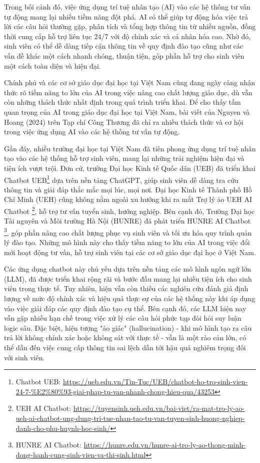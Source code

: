 \documentclass[a4paper,12pt]{article}
\begin{document}
Trong bối cảnh đó, việc ứng dụng trí tuệ nhân tạo (AI) vào các hệ thống tư vấn tự động mang lại nhiều tiềm năng đột phá.
AI có thể giúp tự động hóa việc trả lời các câu hỏi thường gặp, phân tích và tổng hợp thông tin từ nhiều nguồn, đồng thời cung cấp hỗ trợ liên tục 24/7 với độ chính xác và cá nhân hóa cao.
Nhờ đó, sinh viên có thể dễ dàng tiếp cận thông tin về quy định đào tạo cũng như các vấn đề khác một cách nhanh chóng, thuận tiện, góp phần hỗ trợ cho sinh viên một cách toàn diện và hiện đại.

Chính phủ và các cơ sở giáo dục đại học tại Việt Nam cũng đang ngày càng nhận thức rõ tiềm năng to lớn của AI trong việc nâng cao chất lượng giáo dục, dù vẫn còn những thách thức nhất định trong quá trình triển khai.
Để cho thấy tầm quan trọng của AI trong giáo dục đại học tại Việt Nam, bài viết của Nguyen và Hoang (2024) \cite{Nguyen2024AI} trên Tạp chí Công Thương đã chỉ ra nhiều thách thức và cơ hội trong việc ứng dụng AI vào các hệ thống tư vấn tự động.

Gần đây, nhiều trường đại học tại Việt Nam đã tiên phong ứng dụng trí tuệ nhân tạo vào các hệ thống hỗ trợ sinh viên, mang lại những trải nghiệm hiện đại và tiện ích vượt trội.
Đơn cử, trường Đại học Kinh tế Quốc dân (UEB) đã triển khai Chatbot UEB\footnote{Chatbot UEB: \url{https://ueb.edu.vn/Tin-Tuc/UEB/chatbot-ho-tro-sinh-vien-24-7-\%E2\%80\%93-giai-phap-tu-van-nhanh-chong-hieu-qua/43253}} dựa trên nền tảng ChatGPT, giúp sinh viên dễ dàng tra cứu thông tin và giải đáp thắc mắc mọi lúc, mọi nơi.
Đại học Kinh tế Thành phố Hồ Chí Minh (UEH) cũng không nằm ngoài xu hướng khi ra mắt Trợ lý ảo UEH AI Chatbot \footnote{UEH AI Chatbot: \url{https://tuyensinh.ueh.edu.vn/bai-viet/ra-mat-tro-ly-ao-ueh-ai-chatbot-ung-dung-tri-tue-nhan-tao-tu-van-tuyen-sinh-huong-nghiep-danh-cho-phu-huynh-hoc-sinh/}}, hỗ trợ tư vấn tuyển sinh, hướng nghiệp.
Bên cạnh đó, Trường Đại học Tài nguyên và Môi trường Hà Nội (HUNRE) đã phát triển HUNRE AI Chatbot \footnote{HUNRE AI Chatbot: \url{https://hunre.edu.vn/hunre-ai-tro-ly-ao-thong-minh-dong-hanh-cung-sinh-vien-va-thi-sinh.html}}, góp phần nâng cao chất lượng phục vụ sinh viên và tối ưu hóa quy trình quản lý đào tạo.
Những mô hình này cho thấy tiềm năng to lớn của AI trong việc đổi mới hoạt động tư vấn, hỗ trợ sinh viên tại các cơ sở giáo dục đại học ở Việt Nam.

Các ứng dụng chatbot này chủ yếu dựa trên nền tảng các mô hình ngôn ngữ lớn (LLM), đã được triển khai rộng rãi và bước đầu mang lại nhiều tiện ích cho sinh viên trong thực tế.
Tuy nhiên, hiện vẫn còn thiếu các nghiên cứu đánh giá định lượng về mức độ chính xác và hiệu quả thực sự của các hệ thống này khi áp dụng vào việc giải đáp các quy định đào tạo cụ thể.
Bên cạnh đó, các LLM hiện nay vẫn gặp nhiều hạn chế trong việc xử lý các câu hỏi phức tạp đòi hỏi suy luận logic sâu.
Đặc biệt, hiện tượng "ảo giác" (hallucination) - khi mô hình tạo ra câu trả lời không chính xác hoặc không sát với thực tế - vẫn là một rào cản lớn, có thể dẫn đến việc cung cấp thông tin sai lệch dẫn tới hậu quả nghiêm trọng đối với sinh viên.
\end{document}
